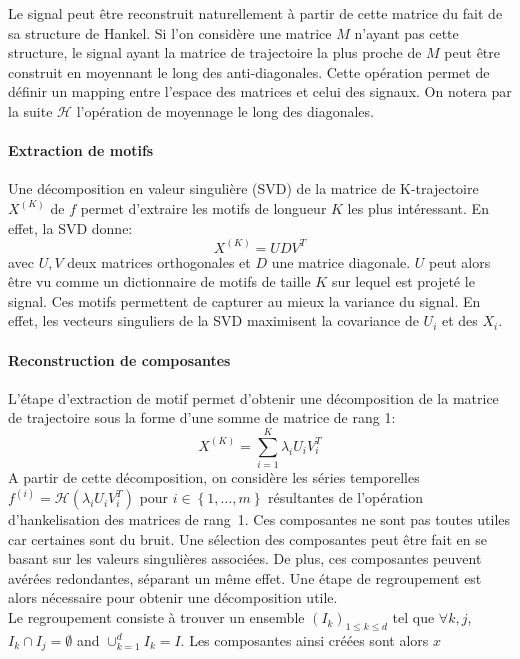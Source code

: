 \documentclass{gretsi}
\def\HH{\mathcal H}
\begin{document}
Le signal peut être reconstruit naturellement à partir de cette matrice du fait de sa structure de Hankel. Si l'on considère une matrice $M$ n'ayant pas cette structure, le signal ayant la matrice de trajectoire la plus proche de $M$ peut être construit en moyennant le long des anti-diagonales. Cette opération permet de définir un mapping entre l'espace des matrices et celui des signaux. On notera par la suite $\HH$ l'opération de moyennage le long des diagonales.

\paragraph{Extraction de motifs}

Une décomposition en valeur singulière (SVD) de la matrice de K-trajectoire $X^{(K)}$ de $f$ permet d'extraire les motifs de longueur $K$ les plus intéressant. En effet, la SVD donne: 
$$
X^{(K)} = U D V^T
$$ avec $U, V$ deux matrices orthogonales et $D$ une matrice diagonale. $U$ peut alors être vu comme un dictionnaire de motifs de taille $K$ sur lequel est projeté le signal. Ces motifs permettent de capturer au mieux la variance du signal. En effet, les vecteurs singuliers de la SVD maximisent la covariance de $U_i$ et des $X_i$.

\paragraph{Reconstruction de composantes}

L'étape d'extraction de motif permet d'obtenir une décomposition de la matrice de trajectoire sous la forme d'une somme de matrice de rang 1:$$
X^{(K)} = \sum_{i=1}^K \lambda_i U_iV_i^T 
$$A partir de cette décomposition, on considère les séries temporelles $f^{(i)} = \HH(\lambda_iU_iV_i^T)$ pour $i \in \left \{ 1,\dots, m \right \}$ résultantes de l'opération d'hankelisation des matrices de \mbox{rang 1}. Ces composantes ne sont pas toutes utiles car certaines sont du bruit. Une sélection des composantes peut être fait en se basant sur les valeurs singulières associées. De plus, ces composantes peuvent avérées redondantes, séparant un même effet. Une étape de regroupement est alors nécessaire pour obtenir une décomposition utile.\\

Le regroupement consiste à trouver un ensemble $(I_k)_{1 \le k \le d}$ tel que $\forall k, j$, $I_k \cap I_j = \emptyset$ and $\displaystyle \cup_{k=1}^d I_k = I$. Les composantes ainsi créées sont alors $x$
\end{document}
